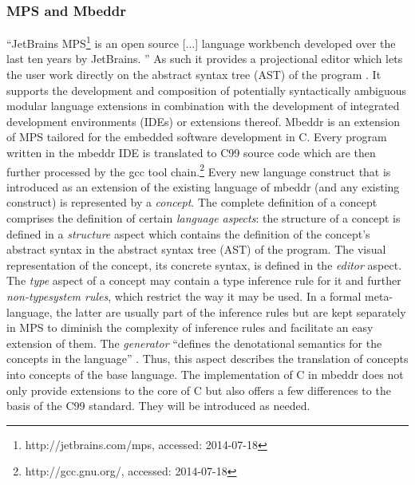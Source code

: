 \subsubsection{MPS and Mbeddr}
``JetBrains MPS\footnote{http://jetbrains.com/mps, accessed: 2014-07-18} is an open source [...] language workbench developed over the last ten years by JetBrains. '' \cite{GenericTools_SpecificLanguages} As such it provides a projectional editor which lets the user work directly on the abstract syntax tree (AST) of the program \cite{LanguageWorkbenches}. It supports the development and composition of potentially syntactically ambiguous modular language extensions in combination with the development of integrated development environments (IDEs) or extensions thereof. Mbeddr is an extension of MPS tailored for the embedded software development in C. Every program written in the mbeddr IDE is translated to C99 source code which are then further processed by the gcc tool chain.\footnote{http://gcc.gnu.org/, accessed: 2014-07-18} Every new language construct that is introduced as an extension of the existing language of mbeddr (and any existing construct) is represented by a \textit{concept}. The complete definition of a concept comprises the definition of certain \textit{language aspects}: the structure of a concept is defined in a \textit{structure} aspect which contains the definition of the concept's abstract syntax in the abstract syntax tree (AST) of the program. The visual representation of the concept, its concrete syntax, is defined in the \textit{editor} aspect. The \textit{type} aspect of a concept may contain a type inference rule for it and further \textit{non-typesystem rules}, which restrict the way it may be used. In a formal meta-language, the latter are usually part of the inference rules but are kept separately in MPS to diminish the complexity of inference rules and facilitate an easy extension of them. The \textit{generator} ``defines the denotational semantics for the concepts in the language'' \cite{GeneratorUserGuide}. Thus, this aspect describes the translation of concepts into concepts of the base language.
The implementation of C in mbeddr does not only provide extensions to the core of C but also offers a few differences to the basis of the C99 standard. They will be introduced as needed.

